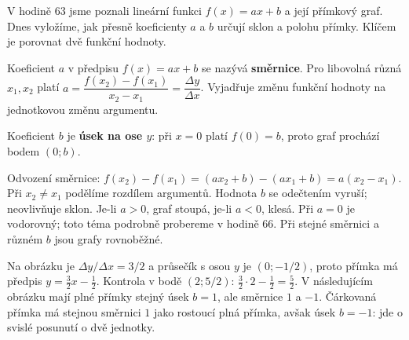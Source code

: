 \documentclass[11pt,a4paper]{article}
\begin{document}
V hodině 63 jsme poznali lineární funkci $f(x)=ax+b$ a její přímkový graf. Dnes vyložíme, jak přesně koeficienty $a$ a $b$ určují sklon a polohu přímky. Klíčem je porovnat dvě funkční hodnoty.
\begin{definiceBox}
Koeficient $a$ v předpisu $f(x)=ax+b$ se nazývá \textbf{směrnice}. Pro libovolná různá $x_1,x_2$ platí $a=\dfrac{f(x_2)-f(x_1)}{x_2-x_1}=\dfrac{\Delta y}{\Delta x}$. Vyjadřuje změnu funkční hodnoty na jednotkovou změnu argumentu.
\end{definiceBox}
\begin{definiceBox}
Koeficient $b$ je \textbf{úsek na ose $y$}: při $x=0$ platí $f(0)=b$, proto graf prochází bodem $(0;b)$.
\end{definiceBox}
Odvození směrnice: $f(x_2)-f(x_1)=(ax_2+b)-(ax_1+b)=a(x_2-x_1)$. Při $x_2\ne x_1$ podělíme rozdílem argumentů. Hodnota $b$ se odečtením vyruší; neovlivňuje sklon. Je-li $a>0$, graf stoupá, je-li $a<0$, klesá. Při $a=0$ je vodorovný; toto téma podrobně probereme v hodině 66. Při stejné směrnici a různém $b$ jsou grafy rovnoběžné.
\begin{center}
\end{center}
Na obrázku je $\Delta y/\Delta x=3/2$ a průsečík s osou $y$ je $(0;-1/2)$, proto přímka má předpis $y=\frac32x-\frac12$. Kontrola v bodě $(2;5/2)$: $\frac32\cdot2-\frac12=\frac52$.
V následujícím obrázku mají plné přímky stejný úsek $b=1$, ale směrnice $1$ a $-1$. Čárkovaná přímka má stejnou směrnici $1$ jako rostoucí plná přímka, avšak úsek $b=-1$: jde o svislé posunutí o dvě jednotky.
\begin{center}
\end{center}
\end{document}

